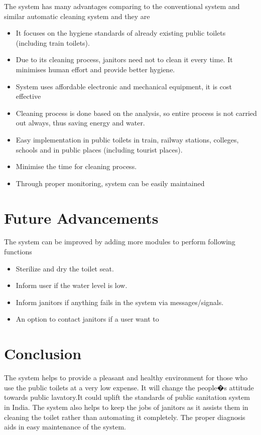 \documentclass[conference]{IEEEtran}
\begin{document}
    The system has many advantages comparing to the conventional system and similar automatic cleaning system and they are
    \begin{itemize}
    \item It focuses on the hygiene standards of already existing public toilets (including train toilets).
    \item Due to its cleaning process, janitors need not to clean it every time. It minimises human effort and provide better hygiene.
    \item System uses affordable electronic and mechanical equipment, it is cost effective
    \item Cleaning process is done based on the analysis, so entire process is not carried out always, thus saving energy and water.
    \item Easy implementation in public toilets in train, railway stations, colleges, schools and in public places (including tourist places).
    \item Minimise the time for cleaning process.
    \item Through proper monitoring, system can be easily maintained
    \end{itemize}
    
\section{Future Advancements}
    The system can be improved by adding more modules to perform following functions
    \begin{itemize}
    \item Sterilize and dry the toilet seat.
    \item Inform user if the water level is low.
    \item Inform janitors if anything fails in the system via messages/signals.
    \item An option to contact janitors if a user want to
    \end{itemize}
    
\section{Conclusion}
    The system helps to provide a pleasant and healthy environment for those who use the public toilets at a very low expense. It will change the people�s attitude towards public lavatory.It could uplift the standards of public sanitation system in India. The system also helps to keep the jobs of janitors as it assists them in cleaning the toilet rather than automating it completely. The proper diagnosis aids in easy maintenance of the system.
    
\end{document}
